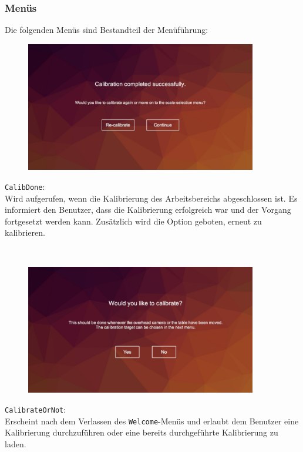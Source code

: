 \subsubsection{Menüs}\label{sec:menus}%
Die folgenden Menüs sind Bestandteil der Menüführung:

\begin{minipage}{0.6\textwidth}
	\begin{figure}[H] 
		\includegraphics[trim=3cm 2cm 3cm 2cm, clip, width=0.9\textwidth]{Bilder/CalibDone.jpg}
			\label{fig:CalibDone}
	\end{figure}
\end{minipage}
\begin{minipage}{0.4\textwidth}
	\texttt{CalibDone}:\\
	Wird aufgerufen, wenn die Kalibrierung des Arbeitsbereichs abgeschlossen ist. Es informiert den Benutzer, dass die Kalibrierung erfolgreich war und der Vorgang fortgesetzt werden kann. Zusätzlich wird die Option geboten, erneut zu kalibrieren.
\end{minipage}\\

\begin{minipage}{0.6\textwidth}
	\begin{figure}[H] 
		\includegraphics[trim=3cm 2cm 2cm 2cm, clip, width=0.9\textwidth]{Bilder/CalibrateOrNot.jpg}
			\label{fig:CalibrateOrNot}
	\end{figure}
\end{minipage}
\begin{minipage}{0.4\textwidth}
	\texttt{CalibrateOrNot}:\\
	Erscheint nach dem Verlassen des \texttt{Welcome}-Menüs und erlaubt dem Benutzer eine Kalibrierung durchzuführen oder eine bereits durchgeführte Kalibrierung zu laden.
\end{minipage}\\

